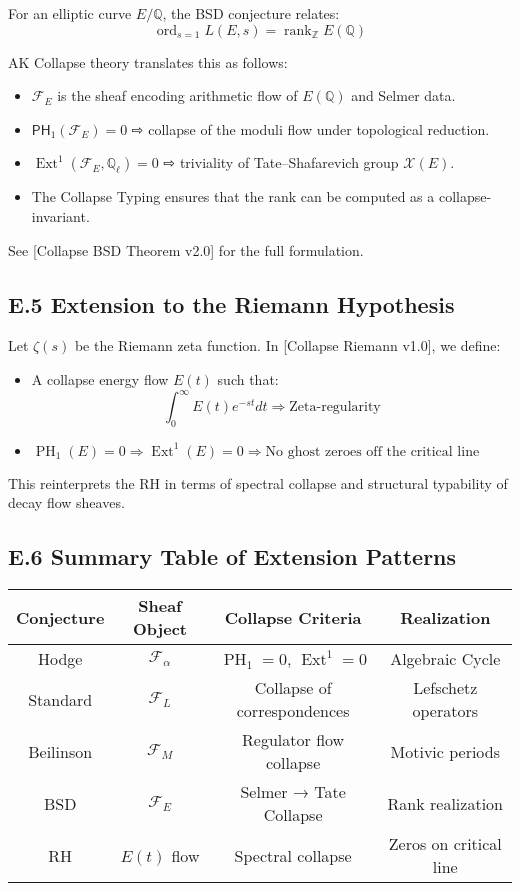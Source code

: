 \documentclass[11pt]{article}
\DeclareMathOperator{\Ext}{Ext}
\DeclareMathOperator{\PH}{PH}
\newcommand{\Sha}{\mathcal{X}}
\begin{document}
For an elliptic curve $E/\mathbb{Q}$, the BSD conjecture relates:
\[
\operatorname{ord}_{s=1} L(E,s) = \operatorname{rank}_{\mathbb{Z}} E(\mathbb{Q})
\]

AK Collapse theory translates this as follows:

\begin{itemize}
  \item $\mathcal{F}_E$ is the sheaf encoding arithmetic flow of $E(\mathbb{Q})$ and Selmer data.
  \item $\mathsf{PH}_1(\mathcal{F}_E) = 0$ ⇨ collapse of the moduli flow under topological reduction.
  \item $\Ext^1(\mathcal{F}_E, \mathbb{Q}_\ell) = 0$ ⇨ triviality of Tate–Shafarevich group $\Sha(E)$.
  \item The Collapse Typing ensures that the rank can be computed as a collapse-invariant.
\end{itemize}

See [Collapse BSD Theorem v2.0] for the full formulation.

\subsection*{E.5 Extension to the Riemann Hypothesis}

Let $\zeta(s)$ be the Riemann zeta function.  
In [Collapse Riemann v1.0], we define:

\begin{itemize}
  \item A collapse energy flow $E(t)$ such that:
  \[
  \int_0^\infty E(t) e^{-st} dt \Rightarrow \text{Zeta-regularity}
  \]
  \item $\PH_1(E) = 0 \Rightarrow \Ext^1(E) = 0 \Rightarrow \text{No ghost zeroes off the critical line}$
\end{itemize}

This reinterprets the RH in terms of spectral collapse and structural typability of decay flow sheaves.

\subsection*{E.6 Summary Table of Extension Patterns}

\begin{center}
\begin{tabular}{|c|c|c|c|}
\hline
\textbf{Conjecture} & \textbf{Sheaf Object} & \textbf{Collapse Criteria} & \textbf{Realization} \\
\hline
Hodge & $\mathcal{F}_\alpha$ & $\PH_1 = 0$, $\Ext^1 = 0$ & Algebraic Cycle \\
\hline
Standard & $\mathcal{F}_L$ & Collapse of correspondences & Lefschetz operators \\
\hline
Beilinson & $\mathcal{F}_M$ & Regulator flow collapse & Motivic periods \\
\hline
BSD & $\mathcal{F}_E$ & Selmer → Tate Collapse & Rank realization \\
\hline
RH & $E(t)$ flow & Spectral collapse & Zeros on critical line \\
\hline
\end{tabular}
\end{center}
\end{document}
